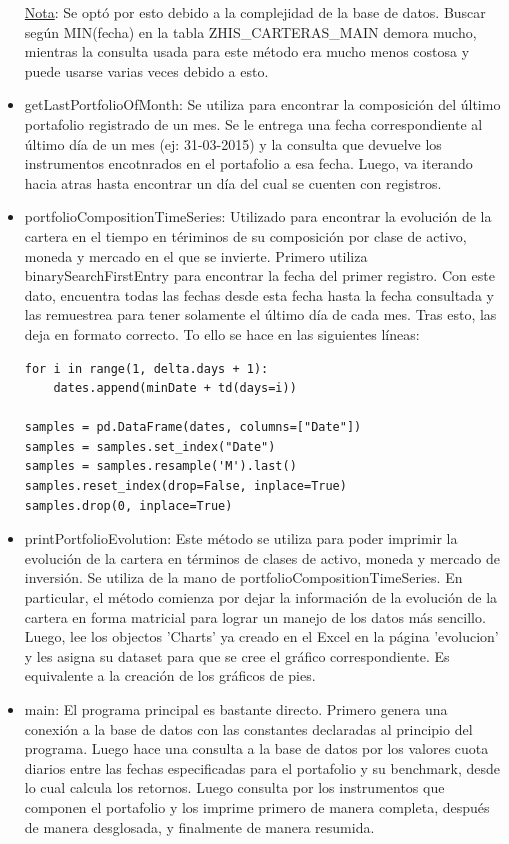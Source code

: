 \documentclass{article}
\begin{document}
\begin{itemize}
\underline{Nota}: Se optó por esto debido a la complejidad de la base de datos. Buscar según MIN(fecha) en la tabla ZHIS\_CARTERAS\_MAIN demora mucho, mientras la consulta usada para este método era mucho menos costosa y puede usarse varias veces debido a esto.

\item getLastPortfolioOfMonth: Se utiliza para encontrar la composición del último portafolio registrado de un mes. Se le entrega una fecha correspondiente al último día de un mes (ej: 31-03-2015) y la consulta que devuelve los instrumentos encotnrados en el portafolio a esa fecha. Luego, va iterando hacia atras hasta encontrar un día del cual se cuenten con registros.

\item portfolioCompositionTimeSeries: Utilizado para encontrar la evolución de la cartera en el tiempo en tériminos de su composición por clase de activo, moneda y mercado en el que se invierte. Primero utiliza binarySearchFirstEntry para encontrar la fecha del primer registro. Con este dato, encuentra todas las fechas desde esta fecha hasta la fecha consultada y las remuestrea para tener solamente el último día de cada mes. Tras esto, las deja en formato correcto. To ello se hace en las siguientes líneas:
\begin{lstlisting}
for i in range(1, delta.days + 1):
    dates.append(minDate + td(days=i))

samples = pd.DataFrame(dates, columns=["Date"])
samples = samples.set_index("Date")
samples = samples.resample('M').last()
samples.reset_index(drop=False, inplace=True)
samples.drop(0, inplace=True)
\end{lstlisting}
\item printPortfolioEvolution: Este método se utiliza para poder imprimir la evolución de la cartera en términos de clases de activo, moneda y mercado de inversión. Se utiliza de la mano de portfolioCompositionTimeSeries. En particular, el método comienza por dejar la información de la evolución de la cartera en forma matricial para lograr un manejo de los datos más sencillo. Luego, lee los objectos 'Charts' ya creado en el Excel en la página 'evolucion' y les  asigna su dataset para que se cree el gráfico correspondiente. Es equivalente a la creación de los gráficos de pies.

\item main: El programa principal es bastante directo. Primero genera una conexión a la base de datos con las constantes declaradas al principio del programa. Luego hace una consulta a la base de datos por los valores cuota diarios entre las fechas especificadas para el portafolio y su benchmark, desde lo cual calcula los retornos. Luego consulta por los instrumentos que componen el portafolio y los imprime primero de manera completa, después de manera desglosada, y finalmente de manera resumida. 


\end{itemize}
\end{document}
